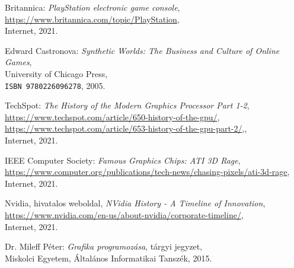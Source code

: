 \begin{thebibliography}{x}
	
	Britannica: \emph{PlayStation electronic game console}, \\
	\url{https://www.britannica.com/topic/PlayStation}, \\
	Internet, 2021.
	
	Edward Castronova: \emph{Synthetic Worlds: The Business and Culture of Online Games}, \\
	University of Chicago Press, \\
	\texttt{ISBN 9780226096278}, 2005.	
	
	TechSpot: \emph{The History of the Modern Graphics Processor Part 1-2}, \\
	\url{https://www.techspot.com/article/650-history-of-the-gpu/}, \\
	\url{https://www.techspot.com/article/653-history-of-the-gpu-part-2/},, \\
	Internet, 2021.
	
	IEEE Computer Society: \emph{Famous Graphics Chips: ATI 3D Rage}, \\
	\url{https://www.computer.org/publications/tech-news/chasing-pixels/ati-3d-rage}, \\
	Internet, 2021.
	
	Nvidia, hivatalos weboldal, \emph{NVidia History - A Timeline of Innovation}, \\
	\url{https://www.nvidia.com/en-us/about-nvidia/corporate-timeline/}, \\
	Internet, 2021.
	
	Dr. Mileff Péter: \emph{Grafika programozása}, tárgyi jegyzet, \\
	Miskolci Egyetem, Általános Informatikai Tanszék, 2015.
	

\end{thebibliography}
